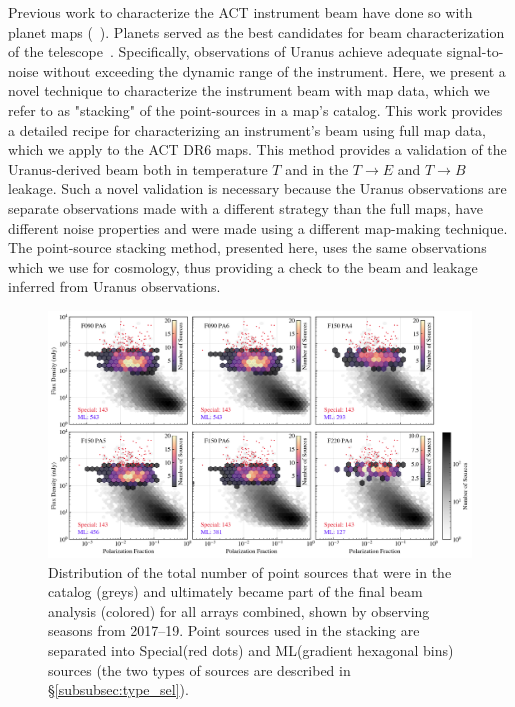 Previous work to characterize the ACT instrument beam have done so with planet maps (~\cite{hasselfield_atacama_2013,louis_2017,naess_2014}).  Planets served as the best candidates for beam characterization of the telescope~\cite{Lungu_2022}.  Specifically, observations of Uranus achieve adequate signal-to-noise without exceeding the dynamic range of the instrument.  Here, we present a novel technique to characterize the instrument beam with map data, which we refer to as "stacking" of the point-sources in a map's catalog.  This work provides a detailed recipe for characterizing an instrument's beam using full map data, which we apply to the ACT DR6 maps.  This method provides a validation of the Uranus-derived beam both in temperature $T$ and in the $T\rightarrow E$ and $T\rightarrow B$ leakage.  Such a novel validation is necessary because the Uranus observations are separate observations made with a different strategy than the full maps, have different noise properties and were made using a different map-making technique.  The point-source stacking method, presented here, uses the same observations which we use for cosmology, thus providing a check to the beam and leakage inferred from Uranus observations.

\begin{figure}[t]
\vspace{1em}
    \centering
    \includegraphics[width=\linewidth]{Figures/pt_src_dist.png}
    \caption{Distribution of the total number of point sources that were in the catalog (greys) and ultimately became part of the final beam analysis (colored) for all arrays combined, shown by observing seasons from 2017--19.  Point sources used in the stacking are separated into Special(red dots) and ML(gradient hexagonal bins) sources (the two types of sources are described in \S\ref{subsubsec:type_sel}).
    }
    \label{fig:ptsrc_select}
    \vspace{1em}
\end{figure}

